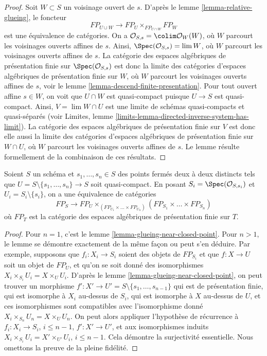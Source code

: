 \begin{proof}
Soit $W \subset S$ un voisinage ouvert de $s$. D'après le
lemme \ref{lemma-relative-glueing}, le foncteur
$$
FP_{U \cup W}
\longrightarrow
FP_U \times_{FP_{U \cap W}} FP_W
$$
est une équivalence de catégories. On a
$\mathcal{O}_{S, s} = \colim \mathcal{O}_W(W)$, où
$W$ parcourt les voisinages ouverts affines de $s$.
Ainsi, $\Spec(\mathcal{O}_{S, s}) = \lim W$, où $W$
parcourt les voisinages ouverts affines de $s$.
La catégorie des espaces algébriques de présentation finie
sur $\Spec(\mathcal{O}_{S, s})$ est donc la limite des
catégories d'espaces algébriques de présentation finie sur
$W$, où $W$ parcourt les voisinages ouverts affines
de $s$, voir le
lemme \ref{lemma-descend-finite-presentation}.
Pour tout ouvert affine $s \in W$, on voit que $U \cap W$
est quasi-compact puisque $U \to S$ est quasi-compact.
Ainsi, $V = \lim W \cap U$ est une limite de
schémas quasi-compacts et quasi-séparés (voir
Limites, lemme \ref{limits-lemma-directed-inverse-system-has-limit}).
La catégorie des espaces algébriques de présentation finie
sur $V$ est donc elle aussi la limite des
catégories d'espaces algébriques de présentation finie sur
$W \cap U$, où $W$ parcourt les voisinages ouverts affines
de $s$. Le lemme résulte formellement de la combinaison
de ces résultats.
\end{proof}

\begin{lemma}
\label{lemma-glueing-near-multiple-closed-points}
Soient $S$ un schéma et $s_1, \ldots, s_n \in S$ des
points fermés deux à deux distincts tels que
$U = S \setminus \{s_1, \ldots, s_n\} \to S$ soit quasi-compact. En posant
$S_i = \Spec(\mathcal{O}_{S, s_i})$ et $U_i = S_i \setminus \{s_i\}$,
on a une équivalence de catégories
$$
FP_S \longrightarrow
FP_U \times_{(FP_{U_1} \times \ldots \times FP_{U_n})}
(FP_{S_1} \times \ldots \times FP_{S_n})
$$
où $FP_T$ est la catégorie des espaces algébriques de présentation finie
sur $T$.
\end{lemma}

\begin{proof}
Pour $n = 1$, c'est le lemme \ref{lemma-glueing-near-closed-point}.
Pour $n > 1$, le lemme se démontre exactement de la même façon ou
peut s'en déduire. Par exemple, supposons que $f_i : X_i \to S_i$
soient des objets de $FP_{S_i}$ et que $f : X \to U$ soit un objet
de $FP_U$, et qu'on se soit donné des isomorphismes $X_i \times_{S_i} U_i = X \times_U U_i$.
D'après le lemme \ref{lemma-glueing-near-closed-point}, on peut trouver
un morphisme $f' : X' \to U' = S \setminus \{s_1, \ldots, s_{n - 1}\}$
qui est de présentation finie, qui est isomorphe à
$X_i$ au-dessus de $S_i$, qui est isomorphe à $X$ au-dessus de $U$, et
ces isomorphismes sont compatibles avec l'isomorphisme donné
$X_i \times_{S_n} U_n = X \times_U U_n$.
On peut alors appliquer l'hypothèse de récurrence à
$f_i : X_i \to S_i$, $i \leq n - 1$,
$f' : X' \to U'$, et aux
isomorphismes induits $X_i \times_{S_i} U_i = X' \times_{U'} U_i$, $i \leq n - 1$.
Cela démontre la surjectivité essentielle. Nous omettons la preuve de la
pleine fidélité.
\end{proof}







